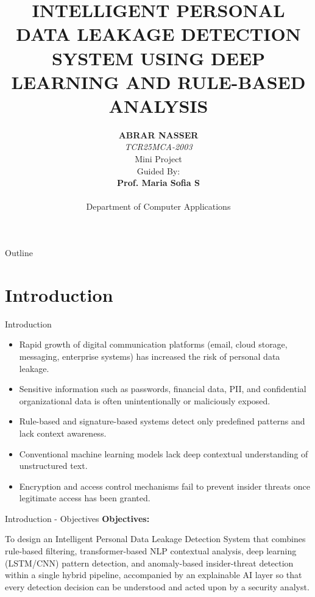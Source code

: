 \documentclass{beamer}
\title{INTELLIGENT PERSONAL DATA LEAKAGE DETECTION SYSTEM USING DEEP LEARNING AND RULE-BASED ANALYSIS}
\author{\textbf{ABRAR NASSER} \\ \textit{TCR25MCA-2003\\} \vspace{0.6cm}     
    Mini Project  \\ 
 \vspace{13mm}     
    Guided By: \\
 \textbf{Prof. Maria Sofia S} \\
    \\
    \vspace{0.3cm}
    Department of Computer Applications\\
}
\date{}
\begin{document}
\begin{frame}[plain]
  \titlepage
\end{frame}

\begin{frame}[allowframebreaks]{Outline}
\setlength{\parskip}{1pt}   
\setlength{\itemsep}{2pt}   
\tableofcontents[
    sectionstyle=show/show,     
    subsectionstyle=hide,       
    subsubsectionstyle=hide
]
\end{frame}

\section{Introduction}
\begin{frame}{Introduction}
\begin{itemize}
  \justifying
  \item Rapid growth of digital communication platforms (email, cloud storage, messaging, enterprise systems) has increased the risk of personal data leakage.
  \item Sensitive information such as passwords, financial data, PII, and confidential organizational data is often unintentionally or maliciously exposed.
  \item Rule-based and signature-based systems detect only predefined patterns and lack context awareness.
  \item Conventional machine learning models lack deep contextual understanding of unstructured text.
  \item Encryption and access control mechanisms fail to prevent insider threats once legitimate access has been granted.
\end{itemize}
\end{frame}

\begin{frame}{Introduction - Objectives}
\textbf{Objectives:}
\vspace{0.3cm}

To design an Intelligent Personal Data Leakage Detection System that combines rule-based filtering, transformer-based NLP contextual analysis, deep learning (LSTM/CNN) pattern detection, and anomaly-based insider-threat detection within a single hybrid pipeline, accompanied by an explainable AI layer so that every detection decision can be understood and acted upon by a security analyst.
\end{frame}
\end{document}
